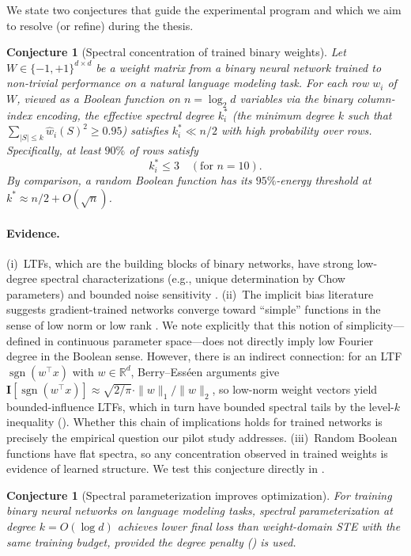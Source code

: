 \documentclass[12pt,a4paper]{article}
\theoremstyle{plain}
\newtheorem{conjecture}[theorem]{Conjecture}
\theoremstyle{definition}
\theoremstyle{remark}
\newcommand{\R}{\mathbb{R}}
\newcommand{\pmone}{\{-1,+1\}}
\newcommand{\what}{\widehat{w}}
\newcommand{\sgn}{\operatorname{sgn}}
\begin{document}
We state two conjectures that guide the experimental program and which we aim to resolve (or refine) during the thesis.

\begin{conjecture}[Spectral concentration of trained binary weights]\label{conj:concentration}
Let $W \in \pmone^{d \times d}$ be a weight matrix from a binary neural network trained to non-trivial performance on a natural language modeling task. For each row $w_i$ of $W$, viewed as a Boolean function on $n = \log_2 d$ variables via the binary column-index encoding, the effective spectral degree $k^*_i$ (the minimum degree $k$ such that $\sum_{|S| \leq k} \what_i(S)^2 \geq 0.95$) satisfies $k^*_i \ll n/2$ with high probability over rows. Specifically, at least $90\%$ of rows satisfy
\begin{equation}
    k^*_i \leq 3 \quad (\text{for } n=10).
\end{equation}
By comparison, a random Boolean function has its $95\%$-energy threshold at $k^* \approx n/2 + O(\sqrt{n})$.
\end{conjecture}

\paragraph{Evidence.} (i)~LTFs, which are the building blocks of binary networks, have strong low-degree spectral characterizations (e.g., unique determination by Chow parameters) and bounded noise sensitivity \citep{harsha2014bounding}. (ii)~The implicit bias literature suggests gradient-trained networks converge toward ``simple'' functions in the sense of low norm or low rank \citep{neyshabur2015norm}. We note explicitly that this notion of simplicity---defined in continuous parameter space---does not directly imply low Fourier degree in the Boolean sense. However, there is an indirect connection: for an LTF $\sgn(w^\top x)$ with $w \in \R^d$, Berry--Ess\'een arguments give $\mathbf{I}[\sgn(w^\top x)] \approx \sqrt{2/\pi}\cdot \|w\|_1 / \|w\|_2$, so low-norm weight vectors yield bounded-influence LTFs, which in turn have bounded spectral tails by the level-$k$ inequality (). Whether this chain of implications holds for trained networks is precisely the empirical question our pilot study addresses. (iii)~Random Boolean functions have flat spectra, so any concentration observed in trained weights is evidence of learned structure. We test this conjecture directly in .

\begin{conjecture}[Spectral parameterization improves optimization]\label{conj:optimization}
For training binary neural networks on language modeling tasks, spectral parameterization at degree $k = O(\log d)$ achieves lower final loss than weight-domain STE with the same training budget, provided the degree penalty () is used.
\end{conjecture}
\end{document}
